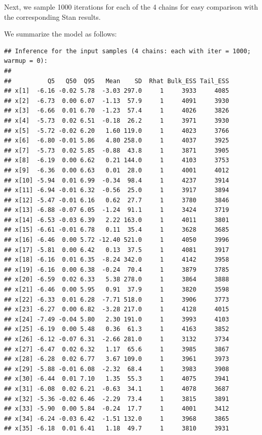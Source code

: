 \documentclass[american,]{article}
\begin{document}
Next, we sample 1000 iterations for each of the 4 chains for easy
comparison with the corresponding Stan results.

We summarize the model as follows:

\begin{verbatim}
## Inference for the input samples (4 chains: each with iter = 1000; warmup = 0):
## 
##          Q5   Q50  Q95   Mean    SD  Rhat Bulk_ESS Tail_ESS
## x[1]  -6.16 -0.02 5.78  -3.03 297.0     1     3933     4085
## x[2]  -6.73  0.00 6.07  -1.13  57.9     1     4091     3930
## x[3]  -6.66  0.01 6.70  -1.23  57.4     1     4026     3826
## x[4]  -5.73  0.02 6.51  -0.18  26.2     1     3971     3930
## x[5]  -5.72 -0.02 6.20   1.60 119.0     1     4023     3766
## x[6]  -6.80 -0.01 5.86   4.80 258.0     1     4037     3925
## x[7]  -5.73  0.02 5.85  -0.88  43.8     1     3871     3905
## x[8]  -6.19  0.00 6.62   0.21 144.0     1     4103     3753
## x[9]  -6.36  0.00 6.63   0.01  28.0     1     4001     4012
## x[10] -5.94  0.01 6.99  -0.34  98.4     1     4237     3914
## x[11] -6.94 -0.01 6.32  -0.56  25.0     1     3917     3894
## x[12] -5.47 -0.01 6.16   0.62  27.7     1     3780     3846
## x[13] -6.88 -0.07 6.05  -1.24  91.1     1     3424     3719
## x[14] -6.53 -0.03 6.39   2.22 163.0     1     4011     3801
## x[15] -6.61 -0.01 6.78   0.11  35.4     1     3628     3685
## x[16] -6.46  0.00 5.72 -12.40 521.0     1     4050     3996
## x[17] -5.81  0.00 6.42   0.13  37.5     1     4081     3917
## x[18] -6.16  0.01 6.35  -8.24 342.0     1     4142     3958
## x[19] -6.16  0.00 6.38  -0.24  70.4     1     3879     3785
## x[20] -6.59  0.02 6.33   5.38 278.0     1     3864     3888
## x[21] -6.46  0.00 5.95   0.91  37.9     1     3820     3598
## x[22] -6.33  0.01 6.28  -7.71 518.0     1     3906     3773
## x[23] -6.27  0.00 6.82  -3.28 217.0     1     4128     4015
## x[24] -7.49 -0.04 5.80   2.30 191.0     1     3993     4103
## x[25] -6.19  0.00 5.48   0.36  61.3     1     4163     3852
## x[26] -6.12 -0.07 6.31  -2.66 281.0     1     3132     3734
## x[27] -6.47  0.02 6.32   1.17  65.6     1     3985     3867
## x[28] -6.28  0.02 6.77   3.67 109.0     1     3961     3973
## x[29] -5.88 -0.01 6.08  -2.32  68.4     1     3983     3908
## x[30] -6.44  0.01 7.10   1.35  55.3     1     4075     3941
## x[31] -6.08  0.02 6.21  -0.63  34.1     1     4078     3687
## x[32] -5.36 -0.02 6.46  -2.29  73.4     1     3815     3891
## x[33] -5.90  0.00 5.84  -0.24  17.7     1     4001     3412
## x[34] -6.24 -0.03 6.42  -1.51 132.0     1     3968     3865
## x[35] -6.18  0.01 6.41   1.18  49.7     1     3810     3931

\end{verbatim}
\end{document}
